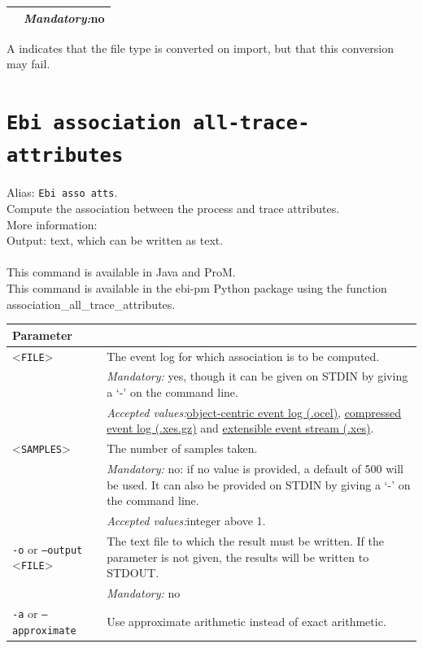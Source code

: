 {\begin{tabularx}{\linewidth}{lX}
&\textit{Mandatory:}\quad no\\
\bottomrule
\end{tabularx}
A \textdagger{} indicates that the file type is converted on import, but that this conversion may fail.
\clearpage\section{\texttt{Ebi association all-trace-attributes}}
\label{command:Ebi association all-trace-attributes}
Alias: \texttt{Ebi asso atts}.\\
Compute the association between the process and trace attributes.\\
More information: \cite{DBLP:journals/tkde/LeemansMPH23}~\\
\noindent Output: text, which can be written as  text.\\
\\This command is available in Java and ProM.
\\This command is available in the ebi-pm Python package using the function association\_all\_trace\_attributes.
\begin{tabularx}{\linewidth}{lX}
\toprule
Parameter \\\midrule
<\texttt{FILE}>&The event log for which association is to be computed.\\
&\textit{Mandatory:} \quad yes, though it can be given on STDIN by giving a `-' on the command line.\\
&\textit{Accepted values:}\quad \hyperref[filehandler:object-centric event log]{object-centric event log (.ocel)}, \hyperref[filehandler:compressed event log]{compressed event log (.xes.gz)} and \hyperref[filehandler:extensible event stream]{extensible event stream (.xes)}.\\
<\texttt{SAMPLES}>&The number of samples taken.\\
&\textit{Mandatory:} \quad no: if no value is provided, a default of 500 will be used. It can also be provided on STDIN by giving a `-' on the command line.\\
&\textit{Accepted values:}\quad integer above 1.\\
\texttt{-o} or \texttt{--output} <\texttt{FILE}> &
The text file to which the result must be written. If the parameter is not given, the results will be written to STDOUT.\\
&\textit{Mandatory:} \quad no\\
\texttt{-a} or \texttt{--approximate} & Use approximate arithmetic instead of exact arithmetic.\\

\end{tabularx}}
